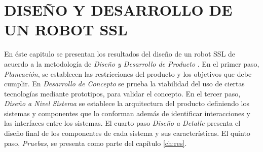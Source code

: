 \chapter{DISEÑO Y DESARROLLO DE UN ROBOT SSL}
\label{ch:disenio_y_des}

En éste capitulo se presentan los resultados del diseño de un robot \gls{SSL} de acuerdo a la metodología de \textit{Diseño y Desarrollo de Producto} \cite{ulrich2009dise}. En el primer paso, \textit{Planeación}, se establecen las restricciones del producto y los objetivos que debe cumplir. En \textit{Desarrollo de Concepto} se prueba la viabilidad del uso de ciertas tecnologías mediante prototipos, para validar el concepto. En el tercer paso, \textit{Diseño a Nivel Sistema} se establece la arquitectura del producto definiendo los sistemas y componentes que lo conforman además de identificar interacciones y las interfaces entre los sistemas. El cuarto paso \textit{Diseño a Detalle} presenta el diseño final de los componentes de cada sistema y sus características. El quinto paso, \textit{Pruebas}, se presenta como parte del capítulo \ref{ch:res}.  
